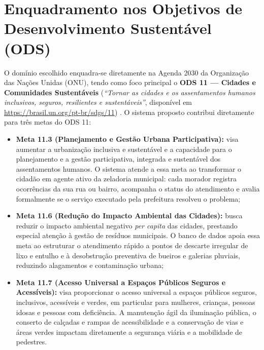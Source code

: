 \documentclass[12pt,a4paper]{article}
\begin{document}
\section{Enquadramento nos Objetivos de Desenvolvimento Sustentável (ODS)}

O domínio escolhido enquadra-se diretamente na Agenda 2030 da Organização das Nações Unidas (ONU), tendo como foco principal o \textbf{ODS 11 --- Cidades e Comunidades Sustentáveis} (\emph{``Tornar as cidades e os assentamentos humanos inclusivos, seguros, resilientes e sustentáveis''}, disponível em \url{https://brasil.un.org/pt-br/sdgs/11}) \cite{onubrasil2015ods11}. O sistema proposto contribui diretamente para três metas do ODS 11:

\begin{itemize}
  \item \textbf{Meta 11.3 (Planejamento e Gestão Urbana Participativa):} visa aumentar a urbanização inclusiva e sustentável e a capacidade para o planejamento e a gestão participativa, integrada e sustentável dos assentamentos humanos. O sistema atende a essa meta ao transformar o cidadão em agente ativo da zeladoria municipal: cada morador registra ocorrências da sua rua ou bairro, acompanha o status do atendimento e avalia formalmente se o serviço executado pela prefeitura resolveu o problema;
  \item \textbf{Meta 11.6 (Redução do Impacto Ambiental das Cidades):} busca reduzir o impacto ambiental negativo \emph{per capita} das cidades, prestando especial atenção à gestão de resíduos municipais. O banco de dados apoia essa meta ao estruturar o atendimento rápido a pontos de descarte irregular de lixo e entulho e à desobstrução preventiva de bueiros e galerias pluviais, reduzindo alagamentos e contaminação urbana;
  \item \textbf{Meta 11.7 (Acesso Universal a Espaços Públicos Seguros e Acessíveis):} visa proporcionar o acesso universal a espaços públicos seguros, inclusivos, acessíveis e verdes, em particular para mulheres, crianças, pessoas idosas e pessoas com deficiência. A manutenção ágil da iluminação pública, o conserto de calçadas e rampas de acessibilidade e a conservação de vias e áreas verdes impactam diretamente a segurança viária e a mobilidade de pedestres.
\end{itemize}
\end{document}
